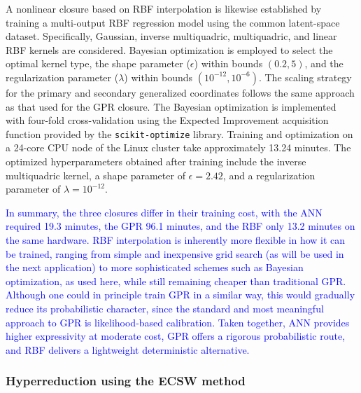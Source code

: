 \documentclass[preprint,10pt]{elsarticle}
\begin{document}
A nonlinear closure based on RBF interpolation is likewise established by training a multi-output RBF regression model using the common latent-space dataset.
Specifically, Gaussian, inverse multiquadric, multiquadric, and linear RBF kernels are considered. Bayesian optimization \cite{cavoretto2024parameter}
is employed to select the optimal kernel type, the shape parameter ($\epsilon$) within bounds $(0.2, 5)$, and the regularization parameter ($\lambda$) within bounds 
$(10^{-12}, 10^{-6})$. The scaling strategy for the primary and secondary generalized coordinates follows the same approach as that used for the GPR closure. The Bayesian optimization
is implemented with four-fold cross-validation using the Expected Improvement acquisition function provided by the \texttt{scikit-optimize} library. Training and optimization on a 
24-core CPU node of the Linux cluster take approximately 13.24 minutes. The optimized hyperparameters obtained after training include the inverse multiquadric kernel, a shape 
parameter of $\epsilon=2.42$, and a regularization parameter of $\lambda=10^{-12}$.

\textcolor{blue}{In summary, the three closures differ in their training cost, with the ANN required 19.3 minutes, the GPR 96.1 minutes, and the RBF only 13.2 minutes on the same hardware. RBF interpolation is inherently more flexible in how it can be trained, ranging from simple and inexpensive grid search (as will be used in the next application) to more sophisticated schemes such as Bayesian optimization, as used here, while still remaining cheaper than traditional GPR. Although one could in principle train GPR in a similar way, this would gradually reduce its probabilistic character, since the standard and most meaningful approach to GPR is likelihood-based calibration. Taken together, ANN provides higher expressivity at moderate cost, GPR offers a rigorous probabilistic route, and RBF delivers a lightweight deterministic alternative.}

\subsubsection{Hyperreduction using the ECSW method}
\end{document}
